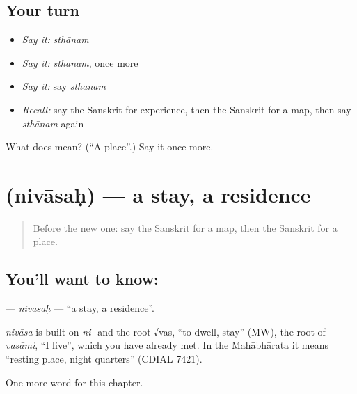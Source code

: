 \subsection*{Your turn}
\begin{itemize}
\raggedright
  \item \emph{Say it:} \emph{sthānam}
  \item \emph{Say it:} \emph{sthānam}, once more
  \item \emph{Say it:} say \emph{sthānam}
  \item \emph{Recall:} say the Sanskrit for experience, then the Sanskrit for a map, then say \emph{sthānam} again
\end{itemize}

\begin{tcolorbox}[breakable,colback=teal!4,colframe=teal!35!black,title={Before you move on}]
What does  mean? (\textquotedblleft{}A place\textquotedblright{}.) Say it once more.
\end{tcolorbox}
\section[\texorpdfstring{\sk{निवासः} (nivāsaḥ)}{निवासः (nivāsaḥ)}]{ (nivāsaḥ) — a stay, a residence}

\label{lesson:SA-C231-nivasah}



\begin{quote}
Before the new one: say the Sanskrit for a map, then the Sanskrit for a place.
\end{quote}

\subsection*{You'll want to know: }
\textbf{} — \emph{nivāsaḥ} — \textquotedblleft{}a stay, a residence\textquotedblright{}.

\begin{cousinweb}
\emph{nivāsa} is built on \emph{ni-} and the root √vas, \textquotedblleft{}to dwell, stay\textquotedblright{} (MW), the root of \emph{vasāmi}, \textquotedblleft{}I live\textquotedblright{}, which you have already met. In the Mahābhārata it means \textquotedblleft{}resting place, night quarters\textquotedblright{} (CDIAL 7421).
\end{cousinweb}

\begin{grammarlens}[title={What you've built}]
One more word for this chapter.
\end{grammarlens}

